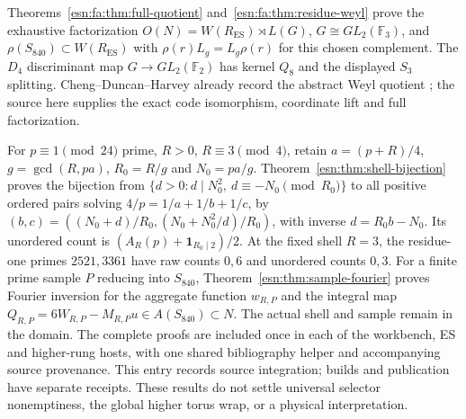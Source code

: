 Theorems~\ref{esn:fa:thm:full-quotient} and~\ref{esn:fa:thm:residue-weyl}
prove the exhaustive factorization
$O(N)=W(R_{\mathrm{ES}})\rtimes L(G)$, $G\cong GL_2(\mathbb F_3)$,
and $\rho(S_{840})\subset W(R_{\mathrm{ES}})$ with
$\rho(r)L_g=L_g\rho(r)$ for this chosen complement.
The $D_4$ discriminant map $G\to GL_2(\mathbb F_2)$ has kernel $Q_8$
and the displayed $S_3$ splitting. Cheng--Duncan--Harvey already record
the abstract Weyl quotient \cite[Table~3]{esn:CDH2014}; the source here
supplies the exact code isomorphism, coordinate lift and full factorization.

For $p\equiv1\pmod{24}$ prime, $R>0$, $R\equiv3\pmod4$, retain
$a=(p+R)/4$, $g=\gcd(R,pa)$, $R_0=R/g$ and $N_0=pa/g$.
Theorem~\ref{esn:thm:shell-bijection} proves the bijection from
$\{d>0:d\mid N_0^2,\ d\equiv-N_0\pmod{R_0}\}$ to all positive
ordered pairs solving $4/p=1/a+1/b+1/c$, by
$(b,c)=((N_0+d)/R_0,(N_0+N_0^2/d)/R_0)$, with inverse $d=R_0b-N_0$.
Its unordered count is $(A_R(p)+\mathbf1_{R_0\mid2})/2$.
At the fixed shell $R=3$, the residue-one primes $2521,3361$ have
raw counts $0,6$ and unordered counts $0,3$. For a finite prime sample
$P$ reducing into $S_{840}$, Theorem~\ref{esn:thm:sample-fourier}
proves Fourier inversion for the aggregate function $w_{R,P}$ and the
integral map $Q_{R,P}=6W_{R,P}-M_{R,P}u\in A(S_{840})\subset N$.
The actual shell and sample remain in the domain. The complete proofs
are included once in each of the workbench, ES and higher-rung hosts,
with one shared bibliography helper and accompanying source provenance.
This entry records source integration; builds and publication have separate
receipts. These results do not settle universal selector nonemptiness,
the global higher torus wrap, or a physical interpretation.
